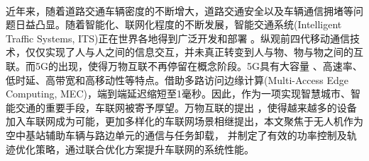 \makeatletter
{}
  \pagestyle{fancy}%
  \fancyhf{}
\makeatother
\newpage\ \vspace{-2.5em}
\begin{center}
\vspace{0.4cm}   %
\makeatletter
{}  %
\makeatother
\end{center}
\vspace{0.7cm}   %
近年来，随着道路交通车辆密度的不断增大，道路交通安全以及车辆通信拥堵等问题日益凸显。随着智能化、联网化程度的不断发展，智能交通系统(Intelligent Traffic Systems, ITS)正在世界各地得到广泛开发和部署
。纵观前四代移动通信技术，仅仅实现了人与人之间的信息交互，并未真正转变到人与物、物与物之间的互联。而5G的出现，使得万物互联不再停留在概念阶段。5G具有大容量
、高速率、低时延、高带宽和高移动性等特点。借助多路访问边缘计算(Multi-Access Edge Computing, MEC)，端到端延迟缩短至1毫秒。因此，作为一项实现智慧城市、智能交通的重要手段，车联网被寄予厚望。万物互联的提出
，使得越来越多的设备加入车联网成为可能，更加多样化的车联网场景相继提出，本文聚焦于无人机作为空中基站辅助车辆与路边单元的通信与任务卸载，
并制定了有效的功率控制及轨迹优化策略，通过联合优化方案提升车联网的系统性能。

